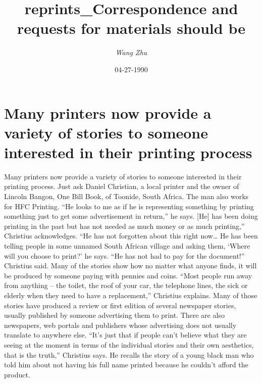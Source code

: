 \documentclass{article}%
\title{reprints\_Correspondence and requests for materials should be}%
\author{\textit{Wang Zhu}}%
\date{04-27-1990}%
\begin{document}
%
\normalsize%
\maketitle%
\section{Many printers now provide a variety of stories to someone interested in their printing process}%
\label{sec:Manyprintersnowprovideavarietyofstoriestosomeoneinterestedintheirprintingprocess}%
Many printers now provide a variety of stories to someone interested in their printing process.\newline%
Just ask Daniel Christian, a local printer and the owner of Lincoln Bangon, One Bill Book, of Toonide, South Africa. The man also works for HFC Printing.\newline%
“He looks to me as if he is representing something by printing something just to get some advertisement in return,” he says.\newline%
{[}He{]} has been doing printing in the past but has not needed as much money or as much printing,” Christius acknowledges.\newline%
“He has not forgotten about this right now… He has been telling people in some unnamed South African village and asking them, ‘Where will you choose to print?’ he says.\newline%
“He has not had to pay for the document!” Christius said.\newline%
Many of the stories show how no matter what anyone finds, it will be produced by someone paying with pennies and coins.\newline%
“Most people run away from anything – the toilet, the roof of your car, the telephone lines, the sick or elderly when they need to have a replacement,” Christius explains.\newline%
Many of those stories have produced a review or first edition of several newspaper stories, usually published by someone advertising them to print.\newline%
There are also newspapers, web portals and publishers whose advertising does not usually translate to anywhere else.\newline%
“It’s just that if people can’t believe what they are seeing at the moment in terms of the individual stories and their own aesthetics, that is the truth,” Christius says.\newline%
He recalls the story of a young black man who told him about not having his full name printed because he couldn’t afford the product.\newline%
\end{document}
